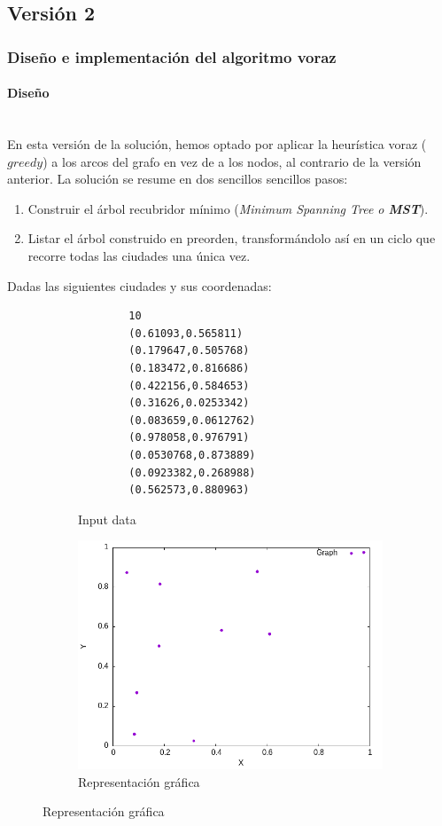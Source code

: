 \documentclass{article}
\newcommand{\myparagraph}[1]{\paragraph{#1}\mbox{}\\}
\begin{document}
\subsection{Versión 2}
\subsubsection{Diseño e implementación del algoritmo voraz}
\myparagraph{Diseño}
En esta versión de la solución, hemos optado por aplicar la heurística voraz ($greedy$) a los arcos del grafo en vez de a los nodos, al contrario de la versión anterior. La solución se resume en dos sencillos sencillos pasos:
\begin{enumerate}
    \item Construir el árbol recubridor mínimo (\textit{Minimum Spanning Tree o \textbf{MST}}).
    \item Listar el árbol construido en preorden, transformándolo así en un ciclo que recorre todas las ciudades una única vez.
\end{enumerate}
\begin{ejemplo}
Dadas las siguientes ciudades y sus coordenadas:
\begin{figure}[H]
    \centering
    \begin{subfigure}{0.3\textwidth}
    \begin{verbatim}
        10
        (0.61093,0.565811)
        (0.179647,0.505768)
        (0.183472,0.816686)
        (0.422156,0.584653)
        (0.31626,0.0253342)
        (0.083659,0.0612762)
        (0.978058,0.976791)
        (0.0530768,0.873889)
        (0.0923382,0.268988)
        (0.562573,0.880963)
    \end{verbatim}
    \caption{Input data}
    \end{subfigure}
    \hfill
    \begin{subfigure}{0.45\textwidth}
        \centering
        \includegraphics[width=\textwidth]{Problema4/imagenes/example_graph.png}
        \caption{Representación gráfica}
        \label{fig:example_graph}
    \end{subfigure}
\end{figure}
\end{ejemplo}
\end{document}
